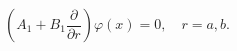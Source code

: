 \begin{equation}
\left( A_{1}+B_{1}\frac{\partial }{\partial r}\right) \varphi
(x)=0,\quad r=a,b.  \label{twospherebc}
\end{equation}

